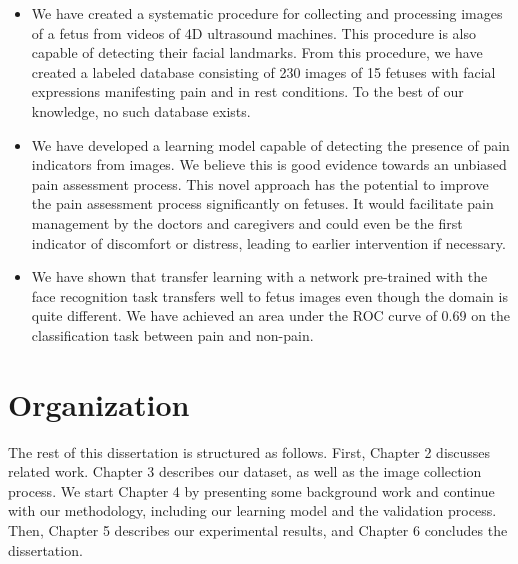 \begin{itemize}
    \item We have created a systematic procedure for collecting and processing images of a fetus from videos of 4D ultrasound machines. This procedure is also capable of detecting their facial landmarks. From this procedure, we have created a labeled database consisting of 230 images of 15 fetuses with facial expressions manifesting pain and in rest conditions. To the best of our knowledge, no such database exists.
    
    \item We have developed a learning model capable of detecting the presence of pain indicators from images. We believe this is good evidence towards an unbiased pain assessment process. This novel approach has the potential to improve the pain assessment process significantly on fetuses. It would facilitate pain management by the doctors and caregivers and could even be the first indicator of discomfort or distress, leading to earlier intervention if necessary.
    
    \item We have shown that transfer learning with a network pre-trained with the face recognition task transfers well to fetus images even though the domain is quite different. We have achieved an area under the ROC curve of 0.69 on the classification task between pain and non-pain.
\end{itemize}

\section{Organization}

The rest of this dissertation is structured as follows. First, Chapter 2 discusses related work. Chapter 3 describes our dataset, as well as the image collection process. We start Chapter 4 by presenting some background work and continue with our methodology, including our learning model and the validation process. Then, Chapter 5 describes our experimental results, and Chapter 6 concludes the dissertation.